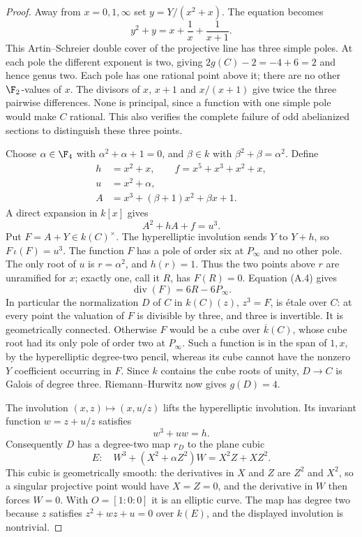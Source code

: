 \begin{proof}
Away from $x=0,1,\infty$ set $y=Y/(x^2+x)$. The equation becomes
\[
 y^2+y=x+\frac1x+\frac1{x+1}.
\]
This Artin--Schreier double cover of the projective line has three
simple poles. At each pole the different exponent is two, giving
$2g(C)-2=-4+6=2$ and hence genus two. Each pole has one rational
point above it; there are no other $\F_2$-values of $x$.
The divisors of $x$, $x+1$ and $x/(x+1)$ give twice the three
pairwise differences. None is principal, since a function with
one simple pole would make $C$ rational. This also verifies the
complete failure of odd abelianized sections to distinguish these
three points.

Choose $\alpha\in\F_4$ with $\alpha^2+\alpha+1=0$, and
$\beta\in k$ with $\beta^2+\beta=\alpha^2$. Define
\[
 \begin{split}
 h&=x^2+x,\qquad f=x^5+x^3+x^2+x,\\
 u&=x^2+\alpha,\\
 A&=x^3+(\beta+1)x^2+\beta x+1.
 \end{split}
\]
A direct expansion in $k[x]$ gives
\[
 A^2+hA+f=u^3.                                                     \tag{A.4}
\]
Put $F=A+Y\in k(C)^\times$. The hyperelliptic involution sends
$Y$ to $Y+h$, so $F\,\iota(F)=u^3$. The function $F$ has a
pole of order six at $P_\infty$ and no other pole.
The only root of $u$ is $r=\alpha^2$, and $h(r)=1$. Thus the
two points above $r$ are unramified for $x$; exactly one, call it
$R$, has $F(R)=0$. Equation (A.4) gives
\[
 \operatorname{div}(F)=6R-6P_\infty.
\]
In particular the normalization $D$ of $C$ in
$k(C)(z)$, $z^3=F$, is \'etale over $C$: at every point the
valuation of $F$ is divisible by three, and three is invertible.
It is geometrically connected. Otherwise $F$ would be a cube
over $\overline k(C)$, whose cube root had its only pole of order
two at $P_\infty$. Such a function is in the span of $1,x$, by
the hyperelliptic degree-two pencil, whereas its cube cannot have
the nonzero $Y$ coefficient occurring in $F$. Since $k$ contains
the cube roots of unity, $D\to C$ is Galois of degree three.
Riemann--Hurwitz now gives $g(D)=4$.

The involution $(x,z)\mapsto(x,u/z)$ lifts the hyperelliptic
involution. Its invariant function $w=z+u/z$ satisfies
\[
 w^3+u w=h.
\]
Consequently $D$ has a degree-two map $r_D$ to the plane cubic
\[
 E:\quad
 W^3+(X^2+\alpha Z^2)W=X^2Z+XZ^2.                                \tag{A.5}
\]
This cubic is geometrically smooth: the derivatives in $X$ and
$Z$ are $Z^2$ and $X^2$, so a singular projective point would
have $X=Z=0$, and the derivative in $W$ then forces $W=0$.
With $O=[1:0:0]$ it is an elliptic curve. The map has degree two
because $z$ satisfies $z^2+wz+u=0$ over $k(E)$, and the displayed
involution is nontrivial.


\end{proof}
